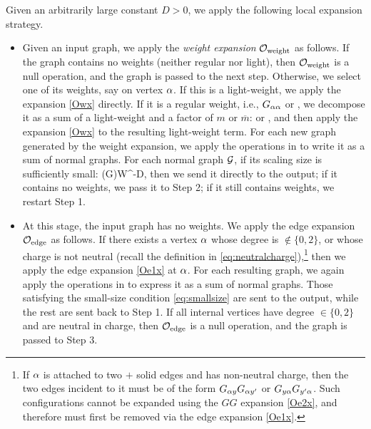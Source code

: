 \begin{strategy}\label{strat_local}
Given an arbitrarily large constant $D>0$, we apply the following local expansion strategy. %
\begin{itemize}
\item[Step 1:] Given an input graph, we apply the \emph{weight expansion} $\cal O_{\mathrm{weight}}$ as follows. If the graph contains no weights (neither regular nor light), then $\cal O_{\mathrm{weight}}$ is a null operation, and the graph is passed to the next step. Otherwise, we select one of its weights, say on vertex $\al$. If this is a light-weight, we apply the expansion \eqref{Owx} directly. If it is a regular weight, i.e., $G_{\al\al}$ or , we decompose it as a sum of a light-weight and a factor of $m$ or $\overline m$:  or , and then apply the expansion \eqref{Owx} to the resulting light-weight term.  
For each new graph generated by the weight expansion, we apply the operations in  to write it as a sum of normal graphs. For each normal graph $\cal G$, if its scaling size is sufficiently small:
\be\label{eq:smallsize}
\size(\cal G)\le W^{-D},
\ee
then we send it directly to the output; if it contains no weights, we pass it to Step 2; if it still contains weights, we restart Step 1.  


\item[Step 2:] At this stage, the input graph has no weights. We apply the edge expansion $\cal O_{\mathrm{edge}}$ as follows. If there exists a vertex $\al$ whose degree is $\notin\{0,2\}$, or whose charge is not neutral (recall the definition in \eqref{eq:neutralcharge}),\footnote{If $\al$ is attached to two $+$ solid edges and has non-neutral charge, then the two edges incident to it must be of the form $G_{\al y}G_{\al y'}$ or $G_{y\al}G_{y'\al}$. Such configurations cannot be expanded using the $GG$ expansion \eqref{Oe2x}, and therefore must first be removed via the edge expansion \eqref{Oe1x}.} then we apply the edge expansion \eqref{Oe1x} at $\al$. 
For each resulting graph, we again apply the operations in  to express it as a sum of normal graphs. Those satisfying the small-size condition \eqref{eq:smallsize} are sent to the output, while the rest are sent back to Step 1.
If all internal vertices have degree $\in \{0,2\}$ and are neutral in charge, then $\cal O_{\mathrm{edge}}$ is a null operation, and the graph is passed to Step 3.  


\end{itemize}
\end{strategy}
